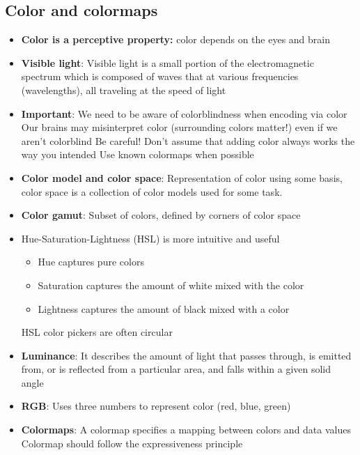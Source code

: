 \documentclass{report}
\begin{document}
    \pagebreak 
    \subsection{Color and colormaps}
    \begin{itemize}
        \item \textbf{Color is a perceptive property:} color depends on the eyes and brain
        \item \textbf{Visible light}: Visible light is a small portion of the electromagnetic spectrum which is composed of waves that at various frequencies (wavelengths), all traveling at the speed of light
        \item \textbf{Important}: We need to be aware of colorblindness when encoding via color
            \bigbreak \noindent 
            Our brains may misinterpret color (surrounding colors matter!) even if we aren't colorblind
            \bigbreak \noindent 
            Be careful! Don't assume that adding color always works the way you intended
            \bigbreak \noindent 
            Use known colormaps when possible
        \item \textbf{Color model and color space}: Representation of color using some basis, color space is a collection of color models used for some task.
        \item \textbf{Color gamut}: Subset of colors, defined by corners of color space
        \item Hue-Saturation-Lightness (HSL) is more intuitive and useful
            \begin{itemize}
                \item Hue captures pure colors
                \item Saturation captures the amount of white mixed with the color
                \item Lightness captures the amount of black mixed with a color
            \end{itemize}
            HSL color pickers are often circular
        \item \textbf{Luminance}: It describes the amount of light that passes through, is emitted from, or is reflected from a particular area, and falls within a given solid angle
        \item \textbf{RGB}: Uses three numbers to represent color (red, blue, green)
        \item \textbf{Colormaps}: A colormap specifies a mapping between colors and data values
            \bigbreak \noindent 
            Colormap should follow the expressiveness principle

\end{itemize}
\end{document}
